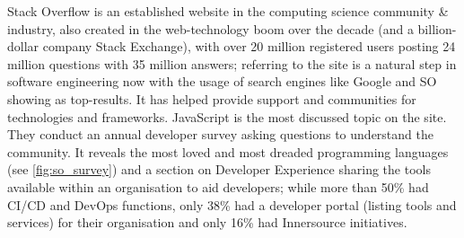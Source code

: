 
Stack Overflow is an established website in the computing science community \& industry, also created in the web-technology boom over the decade (and a billion-dollar company Stack Exchange), with over 20 million registered users posting 24 million questions with 35 million answers; referring to the site is a natural step in software engineering now with the usage of search engines like Google and SO showing as top-results. It has helped provide support and communities for technologies and frameworks. JavaScript is the most discussed topic on the site. They conduct an annual developer survey asking questions to understand the community. It reveals the most loved and most dreaded programming languages (see \autoref{fig:so_survey}) and a section on Developer Experience sharing the tools available within an organisation to aid developers; while more than 50\% had CI/CD and DevOps functions, only 38\% had a developer portal (listing tools and services) for their organisation and only 16\% had Innersource initiatives.

